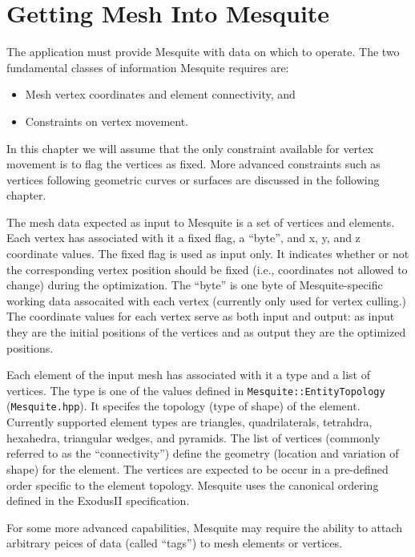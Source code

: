 \chapter{Getting Mesh Into Mesquite}
\label{sec:meshes}

The application must provide Mesquite with data on which to operate.  The two
fundamental classes of information Mesquite requires are:
\begin{itemize}
\item Mesh vertex coordinates and element connectivity, and
\item Constraints on vertex movement.
\end{itemize}
In this chapter we will assume that the only constraint available for vertex movement is to flag the vertices as fixed.  More advanced constraints such as vertices following geometric curves or surfaces are discussed in the following chapter.  

The mesh data expected as input to Mesquite is a set of vertices and elements.  Each vertex has associated with it a fixed flag, a ``byte'', and x, y, and z coordinate values.  The fixed flag is used as input only.  It indicates whether or not the corresponding vertex position should be fixed (i.e., coordinates not allowed to change) during the optimization.  The ``byte'' is one byte of Mesquite-specific working data assocaited with each vertex (currently only used for vertex culling.)   The coordinate values for each vertex serve as both input and output: as input they are the initial positions of the vertices and as output they are the optimized positions.  

Each element of the input mesh has associated with it a type and a list of vertices.  The type is one of the values defined in \texttt{Mesquite::EntityTopology} (\texttt{Mesquite.hpp}).  It specifes the topology (type of shape) of the element. Currently supported element types are triangles, quadrilaterals, 
tetrahdra, hexahedra, triangular wedges, and pyramids.  The list of vertices (commonly referred to as the ``connectivity'') define the geometry (location and variation of shape) for the element.  The vertices are expected to be occur in a pre-defined order specific to the element topology. Mesquite uses the canonical ordering defined in the ExodusII specification\cite{exodus}.

For some more advanced capabilities, Mesquite may require the ability to attach arbitrary peices of data (called ``tags'') to mesh elements or vertices.

